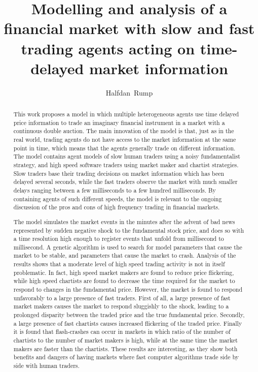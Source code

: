 \documentclass[12pt,a4j,twoside]{article}
\title{Modelling and analysis of a financial market with slow and fast trading agents acting on time-delayed market information}{5}%
\author{Halfdan~Rump}
\begin{document}
\maketitle
\begin{abstract}
This work proposes a model in which multiple heterogeneous agents use time delayed price information to trade an imaginary financial instrument in a market with a continuous double auction. The main innovation of the model is that, just as in the real world, trading agents do not have access to the market information at the same point in time, which means that the agents generally trade on different information. The model contains agent models of slow human traders using a noisy fundamentalist strategy, and high speed software traders using market maker and chartist strategies. Slow traders base their trading decisions on market information which has been delayed several seconds, while the fast traders observe the market with much smaller delays ranging between a few milliseconds to a few hundred milliseconds. By containing agents of such different speeds, the model is relevant to the ongoing discussion of the pros and cons of high frequency trading in financial markets. 

The model simulates the market events in the minutes after the advent of bad news represented by sudden negative shock to the fundamental stock price, and does so with a time resolution high enough to register events that unfold from millisecond to millisecond. A genetic algorithm is used to search for model parameters that cause the market to be stable, and parameters that cause the market to crash. Analysis of the results shows that a moderate level of high speed trading activity is not in itself problematic. In fact, high speed market makers are found to reduce price flickering, while high speed chartists are found to decrease the time required for the market to respond to changes in the fundamental price. However, the market is found to respond unfavorably to a large presence of fast traders. First of all, a large presence of fast market makers causes the market to respond sluggishly to the shock, leading to a prolonged disparity between the traded price and the true fundamental price. Secondly, a large presence of fast chartists causes increased flickering of the traded price. Finally it is found that flash-crashes can occur in markets in which ratio of the number of chartists to the number of market makers is high, while at the same time the market makers are faster than the chartists. These results are interesting, as they show both benefits and dangers of having markets where fast computer algorithms trade side by side with human traders.

\end{abstract}
\end{document}
